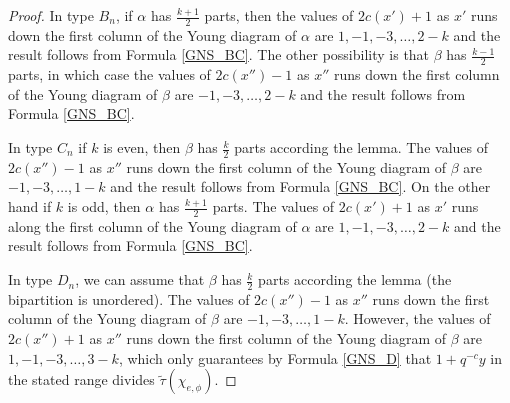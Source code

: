 \documentclass[10pt]{amsart}
\newcommand{\ttau}{\tilde{\tau}}
\theoremstyle{plain}
\theoremstyle{definition}
\theoremstyle{remark}
\begin{document}
\begin{proof}  In type $B_n$, 
if $\alpha$ has $\frac{k+1}{2}$ parts, then the values of $2c(x') +1$
as $x'$ runs down the first column of the Young diagram of $\alpha$ are $1, -1, -3, \dots,  2 -k$
and the result follows from Formula \ref{GNS_BC}.  %
The other possibility is that $\beta$ has $\frac{k-1}{2}$ parts, in which case the values of $2c(x'') -1$
as $x''$ runs down the first column of the Young diagram of $\beta$ are $-1, -3, \dots,  2 -k$
and the result follows from Formula \ref{GNS_BC}.  %

In type $C_n$ if $k$ is even, then $\beta$ has $\frac{k}{2}$ parts according the lemma.  
The values of $2c(x'') -1$
as $x''$ runs down the first column of the Young diagram of $\beta$ are $-1, -3, \dots,  1 -k$
and the result follows from Formula \ref{GNS_BC}.
On the other hand if $k$ is odd, then $\alpha$ has $\frac{k+1}{2}$ parts.
The values of $2c(x') +1$
as $x'$ runs along the first column of the Young diagram of $\alpha$ 
are $1, -1, -3, \dots,  2 -k$
and the result follows from Formula \ref{GNS_BC}.

In type $D_n$, we can assume that $\beta$ has $\frac{k}{2}$ parts according the lemma (the bipartition is unordered).
The values of $2c(x'') -1$ 
as $x''$ runs down the first column of the Young diagram of $\beta$ are $-1, -3, \dots,  1 -k$.  However,
the values of $2c(x'') +1$ 
as $x''$ runs down the first column of the Young diagram of $\beta$ are $1, -1, -3, \dots,  3 -k$,
which only guarantees by Formula \ref{GNS_D}
that $1+q^{-c}y$ in the stated range divides $\ttau(\chi_{e, \phi})$.
\end{proof}

\end{document}
